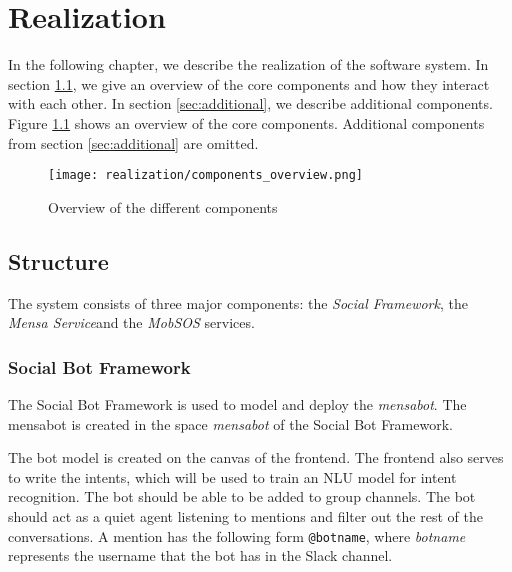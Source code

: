 \chapter{Realization}
In the following chapter, we describe the realization of the software system. In section \ref{sec:structure}, we give an overview of the core components and how they interact with each other. 
In section \ref{sec:additional}, we describe additional components. Figure \ref{fig:componentsOverview} shows an overview of the core components. Additional components from section \ref{sec:additional} are omitted.


\begin{figure}[h]
    \centering
    \texttt{[image: realization/components\_overview.png]}
    \caption{Overview of the different components}
    \label{fig:componentsOverview}
\end{figure}

\section{Structure}\label{sec:structure}
The system consists of three major components: the \emph{Social Framework}, the \emph{Mensa Service}\footnotemark and the \emph{MobSOS} services. 
\subsection{Social Bot Framework}
The Social Bot Framework is used to model and deploy the \emph{mensabot}. The mensabot is created in the space \emph{mensabot} of the Social Bot Framework.

The bot model is created on the canvas of the frontend. 
The frontend also serves to write the intents, which will be used to train an NLU model for intent recognition. 
The bot should be able to be added to group channels. The bot should act as a quiet agent listening to mentions and filter out the rest of the conversations.
A mention has the following form \texttt{@botname}, where \emph{botname} represents the username that the bot has in the Slack channel.


